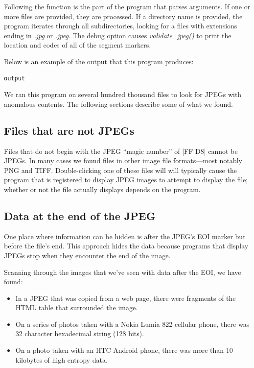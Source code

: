 Following the function is the part of the program that parses
arguments. If one or more files are provided, they are processed. If a directory name is provided, the program iterates
through all subdirectories, looking for a files with extensions ending
in \emph{.jpg} or \emph{.jpeg}. The debug option causes
\emph{validate\_jpeg()} to print the location and codes of all of the segment markers.

Below is an example of the output that this program produces:

\begin{Verbatim}
output
\end{Verbatim}

We ran this program on several hundred thousand files to look for
JPEGs with anomalous contents. The following sections describe some of
what we found.

\subsection{Files that are not JPEGs}

Files that do not begin with the JPEG ``magic number'' of |FF D8|
cannot be JPEGs. In many cases we found files in other image file
formats---most notably PNG and TIFF. Double-clicking one of these
files will will typically cause the program that is registered to
display JPEG images to attempt to display the file; whether or not the
file actually displays depends on the program. 

\subsection{Data at the end of the JPEG}

One place where information can be hidden is after the JPEG's EOI
marker but before the file's end. This approach hides the data because
programs that display JPEGs stop when they encounter the end of the
image.  

Scanning through the images that we've seen with data after the EOI,
we have found:

\begin{itemize}
\item In a JPEG that was copied from a web page, there were fragments
  of the HTML table that surrounded the image.
\item On a series of photos taken with a Nokia Lumia 822 cellular phone,
  there was 32 character hexadecimal string (128 bits).
\item On a photo taken with an HTC Android phone, there was more than
  10 kilobytes of high entropy data.
\end{itemize}


